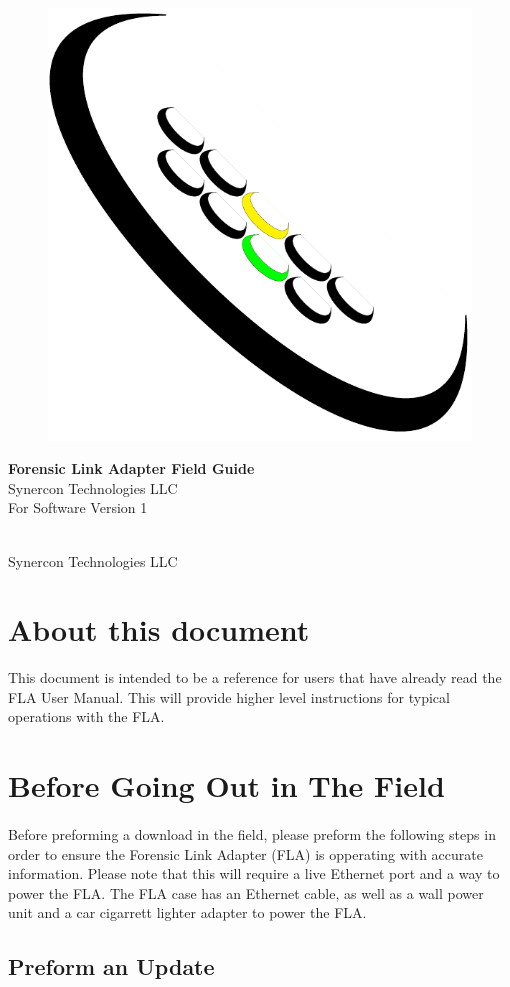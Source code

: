 \documentclass[11pt]{article}
\newcommand*{\titleGP}{\begingroup %
\centering %
\vspace*{\baselineskip} %
\begin{figure}[tbph]
\centering
\includegraphics[width=0.15\linewidth]{../media/logos/synercon_logo_v3_only}
\label{fig:logo}
\end{figure}
\vspace{4cm}
{\Huge \textbf{Forensic Link Adapter Field Guide}}\\[2\baselineskip] %
{\Huge Synercon Technologies LLC}\\[2\baselineskip]
{\Large For Software Version 1}



\vfill %


\textcopyright {\scshape 2015} \\[0.3\baselineskip] %
Synercon Technologies LLC

\endgroup}
\begin{document}







\titleGP %

\newpage

\tableofcontents


\newpage
\section{About this document}
This document is intended to be a reference for users that have already read the FLA User Manual. This will provide higher level instructions for typical operations with the FLA.
\section{Before Going Out in The Field}
\paragraph{  }
Before preforming a download in the field, please preform the following steps in order to ensure the Forensic Link Adapter (FLA) is opperating with accurate information. Please note that this will require a live Ethernet port and a way to power the FLA. The FLA case has an Ethernet cable, as well as a wall power unit and a car cigarrett lighter adapter to power the FLA.
\subsection{Preform an Update}
\end{document}
